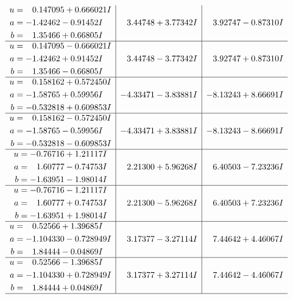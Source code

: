 \documentclass[1p]{elsarticle_modified}
\theoremstyle{definition}
\begin{document}
$$\begin{array}{c|c|c}
\begin{aligned}
u &= \phantom{-}0.147095 + 0.666021 I \\
a &= -1.42462 - 0.91452 I \\
b &= \phantom{-}1.35466 + 0.66805 I\end{aligned}
 & \phantom{-}3.44748 + 3.77342 I & \phantom{-}3.92747 - 0.87310 I \\ \hline\begin{aligned}
u &= \phantom{-}0.147095 - 0.666021 I \\
a &= -1.42462 + 0.91452 I \\
b &= \phantom{-}1.35466 - 0.66805 I\end{aligned}
 & \phantom{-}3.44748 - 3.77342 I & \phantom{-}3.92747 + 0.87310 I \\ \hline\begin{aligned}
u &= \phantom{-}0.158162 + 0.572450 I \\
a &= -1.58765 + 0.59956 I \\
b &= -0.532818 + 0.609853 I\end{aligned}
 & -4.33471 - 3.83881 I & -8.13243 + 8.66691 I \\ \hline\begin{aligned}
u &= \phantom{-}0.158162 - 0.572450 I \\
a &= -1.58765 - 0.59956 I \\
b &= -0.532818 - 0.609853 I\end{aligned}
 & -4.33471 + 3.83881 I & -8.13243 - 8.66691 I \\ \hline\begin{aligned}
u &= -0.76716 + 1.21117 I \\
a &= \phantom{-}1.60777 - 0.74753 I \\
b &= -1.63951 - 1.98014 I\end{aligned}
 & \phantom{-}2.21300 + 5.96268 I & \phantom{-}6.40503 - 7.23236 I \\ \hline\begin{aligned}
u &= -0.76716 - 1.21117 I \\
a &= \phantom{-}1.60777 + 0.74753 I \\
b &= -1.63951 + 1.98014 I\end{aligned}
 & \phantom{-}2.21300 - 5.96268 I & \phantom{-}6.40503 + 7.23236 I \\ \hline\begin{aligned}
u &= \phantom{-}0.52566 + 1.39685 I \\
a &= -1.104330 - 0.728949 I \\
b &= \phantom{-}1.84444 - 0.04869 I\end{aligned}
 & \phantom{-}3.17377 - 3.27114 I & \phantom{-}7.44642 + 4.46067 I \\ \hline\begin{aligned}
u &= \phantom{-}0.52566 - 1.39685 I \\
a &= -1.104330 + 0.728949 I \\
b &= \phantom{-}1.84444 + 0.04869 I\end{aligned}
 & \phantom{-}3.17377 + 3.27114 I & \phantom{-}7.44642 - 4.46067 I\\
 \hline 
 \end{array}$$\newpage
\end{document}

